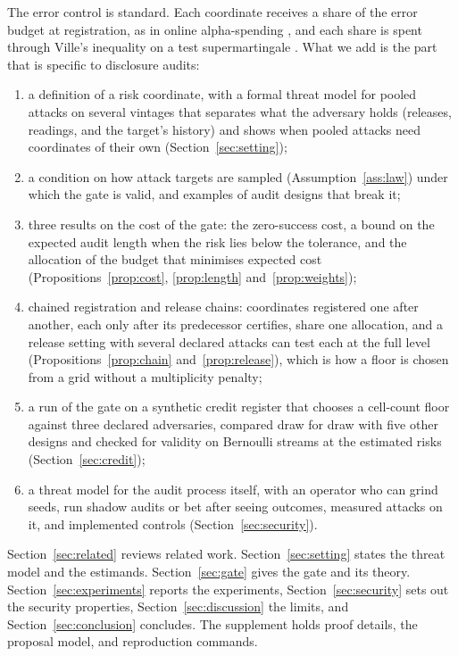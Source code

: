 \documentclass{jpc}
\theoremstyle{remark}
\begin{document}
The error control is standard. Each coordinate receives a share of the error budget at registration, as in online alpha-spending \cite{foster2008,tian2021}, and each share is spent through Ville's inequality on a test supermartingale \cite{ville1939,shafer2011,ramdas2023}. What we add is the part that is specific to disclosure audits:
\begin{enumerate}
\item a definition of a risk coordinate, with a formal threat model for pooled attacks on several vintages that separates what the adversary holds (releases, readings, and the target's history) and shows when pooled attacks need coordinates of their own (Section~\ref{sec:setting});
\item a condition on how attack targets are sampled (Assumption~\ref{ass:law}) under which the gate is valid, and examples of audit designs that break it;
\item three results on the cost of the gate: the zero-success cost, a bound on the expected audit length when the risk lies below the tolerance, and the allocation of the budget that minimises expected cost (Propositions~\ref{prop:cost}, \ref{prop:length} and~\ref{prop:weights});
\item chained registration and release chains: coordinates registered one after another, each only after its predecessor certifies, share one allocation, and a release setting with several declared attacks can test each at the full level (Propositions~\ref{prop:chain} and~\ref{prop:release}), which is how a floor is chosen from a grid without a multiplicity penalty;
\item a run of the gate on a synthetic credit register that chooses a cell-count floor against three declared adversaries, compared draw for draw with five other designs and checked for validity on Bernoulli streams at the estimated risks (Section~\ref{sec:credit});
\item a threat model for the audit process itself, with an operator who can grind seeds, run shadow audits or bet after seeing outcomes, measured attacks on it, and implemented controls (Section~\ref{sec:security}).
\end{enumerate}

Section~\ref{sec:related} reviews related work. Section~\ref{sec:setting} states the threat model and the estimands. Section~\ref{sec:gate} gives the gate and its theory. Section~\ref{sec:experiments} reports the experiments, Section~\ref{sec:security} sets out the security properties, Section~\ref{sec:discussion} the limits, and Section~\ref{sec:conclusion} concludes. The supplement holds proof details, the proposal model, and reproduction commands.
\end{document}
